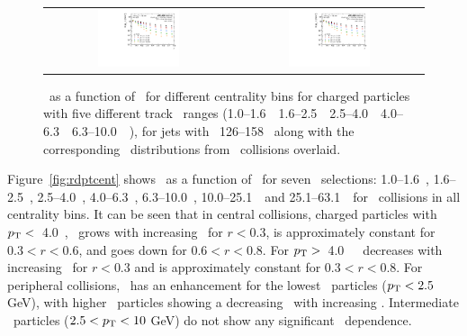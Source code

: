\begin{figure}
{\begin{tabular}{cc}
	 \includegraphics[width=0.45\textwidth]{figures_results/DpT_dR_jet7_cent4} &
	 \includegraphics[width=0.45\textwidth]{figures_results/DpT_dR_jet7_cent5} \\
\end{tabular} }
   \caption{ \Dptr\ as a function of \rvar\ for different centrality bins for charged particles with five different track \pT\ ranges (1.0--1.6~\GeV\, 1.6--2.5~\GeV\, 2.5--4.0~\GeV\, 4.0--6.3~\GeV\, 6.3--10.0~\GeV\ ), for jets with \pt\ 126--158 \GeV\, along with the corresponding \Dptr\ distributions from \pp\ collisions overlaid. }
      \label{fig:dptr_pbpb_pp}
\end{figure}



Figure~\ref{fig:rdptcent} shows \RDptr\ as a function of \rvar\ for seven \pt\ selections: 1.0--1.6~\GeV, 1.6--2.5~\GeV, 2.5--4.0~\GeV, 4.0--6.3~\GeV, 6.3--10.0~\GeV, 10.0--25.1~\GeV\ and 25.1--63.1~\GeV\ for \pbpb\ collisions in all centrality bins. It can be seen that in central collisions, charged particles
with $p_{\mathrm{T}} <$~4.0~\GeV, \RDptr\ grows with increasing \rvar\ for $r <0.3$, is approximately constant for
$0.3 < r <0.6$, and goes down for $0.6 < r < 0.8$.  For $p_{\mathrm{T}} > $~4.0~\GeV\ \RDptr\ decreases with increasing \rvar\ for $ r < 0.3$
and is approximately constant for $ 0.3 < r <0.8$.
For peripheral collisions, \RDptr\ has an enhancement for the lowest \pt\ particles ($p_{\mathrm{T}} < 2.5$ GeV), with higher \pt\ particles showing a decreasing \RDptr\ with increasing \rvar. Intermediate \pt\ particles ($2.5 < p_{\mathrm{T}} < 10 $ GeV) do not show any significant \rvar\ dependence.

